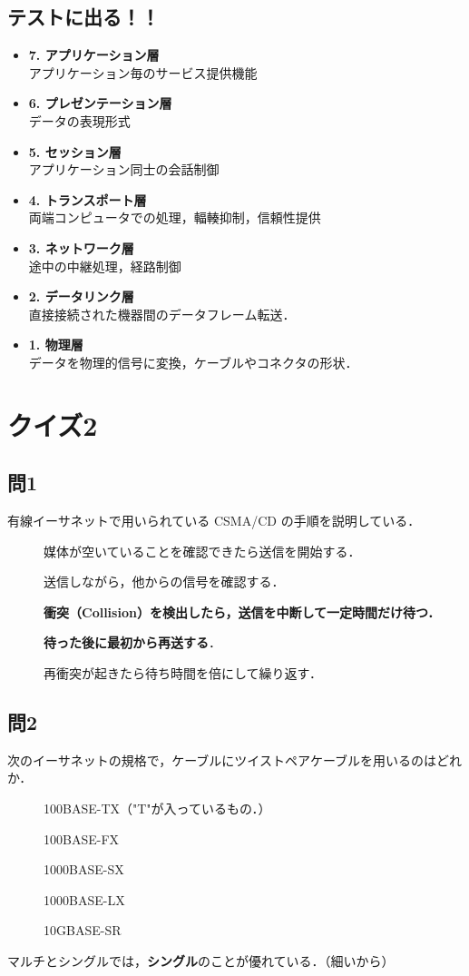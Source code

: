 \documentclass[paper=a4,10pt,twocolumn]{jlreq}
\begin{document}
\subsection*{テストに出る！！}
\begin{itemize}
    \item \textbf{7. アプリケーション層}\\
          アプリケーション毎のサービス提供機能
    \item \textbf{6. プレゼンテーション層}\\
          データの表現形式
    \item \textbf{5. セッション層}\\
          アプリケーション同士の会話制御
    \item \textbf{4. トランスポート層}\\
          両端コンピュータでの処理，輻輳抑制，信頼性提供
    \item \textbf{3. ネットワーク層}\\
          途中の中継処理，経路制御
    \item \textbf{2. データリンク層}\\
          直接接続された機器間のデータフレーム転送．
    \item \textbf{1. 物理層}\\
          データを物理的信号に変換，ケーブルやコネクタの形状．
\end{itemize}
\newpage
\section*{クイズ2}
\subsection*{問1}
有線イーサネットで用いられている CSMA/CD の手順を説明している．
\begin{description}
    \item[\ci] 媒体が空いていることを確認できたら送信を開始する．
    \item[\ci] 送信しながら，他からの信号を確認する．
    \item[\bt] \textbf{衝突（Collision）を検出したら，送信を中断して一定時間だけ待つ．}
    \item[\ci] \textbf{待った後に最初から再送する}．
    \item[\ci] 再衝突が起きたら待ち時間を倍にして繰り返す．
\end{description}
\subsection*{問2}
次のイーサネットの規格で，ケーブルにツイストペアケーブルを用いるのはどれか．
\begin{description}
    \item[\ci] 100BASE-TX（"T"が入っているもの．）
    \item[\bt] 100BASE-FX
    \item[\bt] 1000BASE-SX
    \item[\bt] 1000BASE-LX
    \item[\bt] 10GBASE-SR
\end{description}
マルチとシングルでは，\textbf{シングル}のことが優れている．（細いから）
\end{document}
